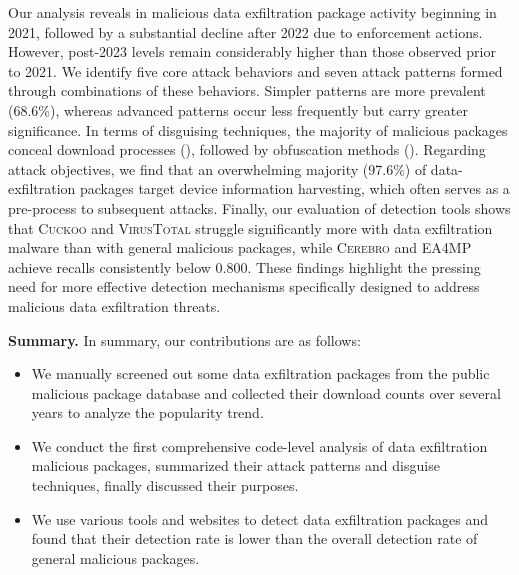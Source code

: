 Our analysis reveals  in malicious data exfiltration package activity beginning in 2021, followed by a substantial decline after 2022 due to enforcement actions. However, post-2023 levels remain considerably higher than those observed prior to 2021. We identify five core attack behaviors and seven attack patterns formed through combinations of these behaviors. Simpler patterns are more prevalent (68.6\%), whereas advanced patterns occur less frequently but carry greater significance. In terms of disguising techniques, the majority of malicious packages conceal download processes (), followed by obfuscation methods (). Regarding attack objectives, we find that an overwhelming majority (97.6\%) of data-exfiltration packages target device information harvesting, which often serves as a pre-process to subsequent attacks. Finally, our evaluation of detection tools shows that \textsc{Cuckoo} and \textsc{VirusTotal} struggle significantly more with data exfiltration malware than with general malicious packages, while \textsc{Cerebro} and \textsc{EA4MP} achieve recalls consistently below 0.800. These findings highlight the pressing need for more effective detection mechanisms specifically designed to address malicious data exfiltration threats.


\textbf{Summary.} In summary, our contributions are as follows:

\begin{itemize}
    \item We manually screened out some data exfiltration packages from the public malicious package database and collected their download counts over several years to analyze the popularity trend. 
    \item We conduct the first comprehensive code-level analysis of data exfiltration malicious packages, summarized their attack patterns and disguise techniques, finally discussed their purposes.
    \item We use various tools and websites to detect data exfiltration packages and found that their detection rate is lower than the overall detection rate of general malicious packages.
\end{itemize}






